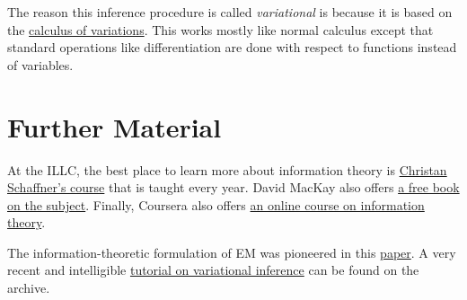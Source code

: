 The reason this inference procedure is called \textit{variational} is because it is based on the 
\href{https://en.wikipedia.org/wiki/Calculus_of_variations}{calculus of variations}. This works mostly
like normal calculus except that standard operations like differentiation are done with respect to functions
instead of variables.




\section*{Further Material}

At the ILLC, the best place to learn more about information theory is \href{http://homepages.cwi.nl/~schaffne/courses/inftheory/2015/}{Christan Schaffner's
course} that is taught every year. David MacKay also offers \href{http://www.inference.phy.cam.ac.uk/itprnn/book.pdf}{a free book on the subject}. Finally,
Coursera also offers \href{https://www.coursera.org/course/informationtheory}{an online course on information theory}.

The information-theoretic formulation of EM was pioneered in this \href{http://www.cs.toronto.edu/~fritz/absps/emk.pdf}{paper}. A very recent and intelligible 
\href{https://arxiv.org/abs/1601.00670}{tutorial on variational inference} can be found on the archive.



